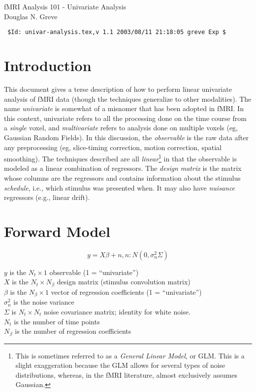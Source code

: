 \documentclass{article}
\begin{document}
\begin{LARGE}
\begin{center}
fMRI Analysis 101 - Univariate Analysis\\
Douglas N. Greve\\
\begin{verbatim}
 $Id: univar-analysis.tex,v 1.1 2003/08/11 21:18:05 greve Exp $
\end{verbatim}
\end{center}
\end{LARGE}

\section{Introduction}

This document gives a terse description of how to perform linear
univariate analysis of fMRI data (though the techniques generalize to
other modalities). The name {\em univariate} is somewhat of a misnomer
that has been adopted in fMRI.  In this context, univariate refers to
all the processing done on the time course from a {\em single} voxel,
and {\em multivariate} refers to analysis done on multiple voxels (eg,
Gaussian Random Fields). In this discussion, the {\em observable} is
the raw data after any preprocessing (eg, slice-timing correction,
motion correction, spatial smoothing). The techniques described are
all {\em linear}\footnote{This is sometimes referred to as a {\em
General Linear Model}, or GLM. This is a slight exaggeration because
the GLM allows for several types of noise distributions, whereas, in
the fMRI literature, almost exclusively assumes Gaussian.} in that the
observable is modeled as a linear combination of regressors. The {\em
design matrix} is the matrix whose columns are the regressors and
contains information about the stimulus {\em schedule}, i.e., which
stimulus was presented when. It may also have {\em nuisance}
regressors (e.g., linear drift).

\section{Forward Model}

\begin{equation}
y = X \beta + n, n: N(0,\sigma_n^2 \Sigma)
\end{equation}

\noindent
$y$ is the $N_t \times 1$ observable (1 = ``univariate'')\\
$X$ is the $N_t \times N_\beta$ design matrix (stimulus convolution matrix) \\
$\beta$ is the $N_\beta \times 1$ vector of regression coefficients (1 = ``univariate'')\\
$\sigma_n^2$ is the noise variance \\
$\Sigma$ is $N_t \times N_t$ noise covariance matrix; identity for
white noise.\\
$N_t$ is the number of time points\\
$N_\beta$ is the number of regression coefficients\\
\end{document}
